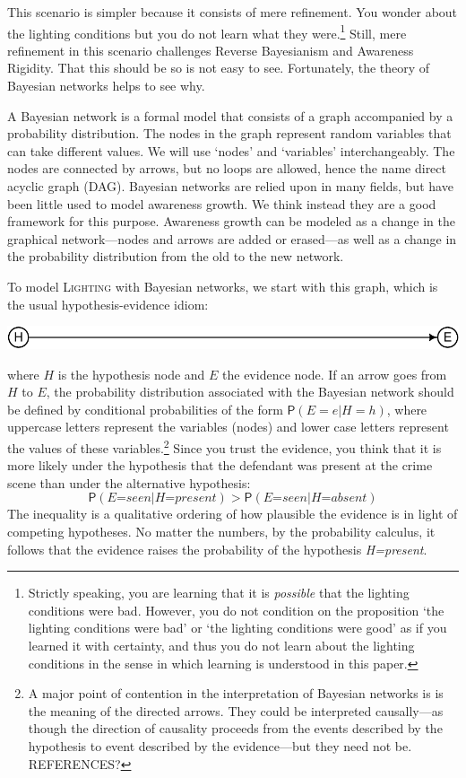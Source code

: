 \documentclass[
  11pt,
  dvipsnames,enabledeprecatedfontcommands]{scrartcl}
\newcommand{\pr}[1]{\ensuremath{\mathsf{P}(#1)}}
\begin{document}
\noindent This scenario is simpler because it consists of mere
refinement. You wonder about the lighting conditions but you do not
learn what they were.\footnote{Strictly speaking, you are learning that
  it is \emph{possible} that the lighting conditions were bad. However,
  you do not condition on the proposition `the lighting conditions were
  bad' or `the lighting conditions were good' as if you learned it with
  certainty, and thus you do not learn about the lighting conditions in
  the sense in which learning is understood in this paper.} Still, mere
refinement in this scenario challenges Reverse Bayesianism and Awareness
Rigidity. That this should be so is not easy to see. Fortunately, the
theory of Bayesian networks helps to see why.

A Bayesian network is a formal model that consists of a graph
accompanied by a probability distribution. The nodes in the graph
represent random variables that can take different values. We will use
`nodes' and `variables' interchangeably. The nodes are connected by
arrows, but no loops are allowed, hence the name direct acyclic graph
(DAG). Bayesian networks are relied upon in many fields, but have been
little used to model awareness growth. We think instead they are a good
framework for this purpose. Awareness growth can be modeled as a change
in the graphical network---nodes and arrows are added or erased---as
well as a change in the probability distribution from the old to the new
network.

To model \textsc{Lighting} with Bayesian networks, we start with this
graph, which is the usual hypothesis-evidence idiom:

\begin{center}\includegraphics[width=0.5\linewidth,height=0.3\textheight]{ReplyToSteeleStefansson2_files/figure-latex/heDAG-1} \end{center}

where \(H\) is the hypothesis node and \(E\) the evidence node. If an
arrow goes from \(H\) to \(E\), the probability distribution associated
with the Bayesian network should be defined by conditional probabilities
of the form \(\pr{E=e \vert H=h}\), where uppercase letters represent
the variables (nodes) and lower case letters represent the values of
these variables.\footnote{A major point of contention in the
  interpretation of Bayesian networks is is the meaning of the directed
  arrows. They could be interpreted causally---as though the direction
  of causality proceeds from the events described by the hypothesis to
  event described by the evidence---but they need not be. REFERENCES?}
Since you trust the evidence, you think that it is more likely under the
hypothesis that the defendant was present at the crime scene than under
the alternative hypothesis:
\[\pr{\textit{E=seen} \vert \textit{H=present}} > \pr{\textit{E=seen} \vert \textit{H=absent}}\]
The inequality is a qualitative ordering of how plausible the evidence
is in light of competing hypotheses. No matter the numbers, by the
probability calculus, it follows that the evidence raises the
probability of the hypothesis \textit{H=present}.
\end{document}

